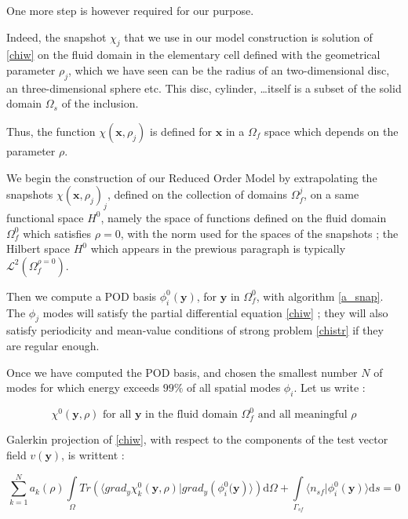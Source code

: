 One more step is however required for our purpose.

\par
Indeed, the snapshot $\chi_j$ that we use in our model construction is solution of \ref{chiw} on the fluid domain in %
the elementary cell defined with the geometrical parameter $\rho_j$, %
which we have seen can be the radius of an two-dimensional disc, an three-dimensional sphere etc. %
This disc, cylinder, \dots itself is a subset of the solid domain $\Omega_s$ of the inclusion.

\par
Thus, the function $\chi(\mathbf{x},\rho_j)$ is defined for $\mathbf{x}$ in a $\Omega_f$ space which depends on the parameter $\rho$.

\etoile
We begin the construction of our Reduced Order Model by extrapolating the snapshots $\chi(\mathbf{x},\rho_j)_j$, defined on the collection of domains $\Omega_f^j$, %
on a same functional space $H^0$, namely the space of functions defined on the fluid domain $\Omega_f^0$ which satisfies $\rho=0$, %
with the norm used for the spaces of the snapshots ; %
the Hilbert space $H^0$ which appears in the prewious paragraph is typically $\mathcal{L}^2\left(\Omega_f^{\rho=0}\right)$.

\par
Then we compute a POD basis $\phi_i^0(\mathbf{y})$, for $\mathbf{y}$ in $\Omega_f^0$, with algorithm \ref{a_snap}. %
The $\phi_j$ modes will satisfy the partial differential equation \ref{chiw} ; %
they will also satisfy periodicity and mean-value conditions of strong problem \ref{chistr} if they are regular enough.

\etoile
Once we have computed the POD basis, and chosen the smallest number $N$ of modes for which energy exceeds $99\%$ of all spatial modes $\phi_i$. %
Let us write :

\[\chi^0\left(\mathbf{y},\rho\right)\text{ for all $\mathbf{y}$ in the fluid domain $\Omega_f^0$ and all meaningful $\rho$}\]

\par
Galerkin projection of \ref{chiw}, with respect to the components of the test vector field $v(\mathbf{y})$, is writtent :

\begin{equation}\label{morchiz}
\sum\limits_{k=1}^N a_k(\rho)\int\limits_{\Omega}Tr\left(\langle grad_y\chi_k^0 \left(\mathbf{y},\rho\right)|grad_y\left(\phi_i^0(\mathbf{y}\right)\rangle\right)\text{d}\Omega+%
\int\limits_{\Gamma_{sf}}\langle n_{sf}|\phi_i^0(\mathbf{y})\rangle \text{d}s %
=0
\end{equation}

